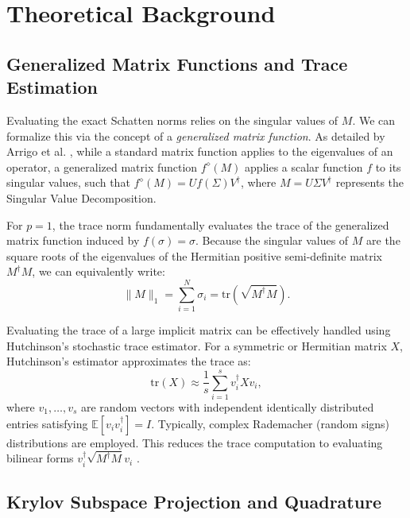 \documentclass[a4paper,11pt]{article}
\begin{document}
\section{Theoretical Background}

\subsection{Generalized Matrix Functions and Trace Estimation}

Evaluating the exact Schatten norms relies on the singular values of $M$. We can formalize this via the concept of a \textit{generalized matrix function}. As detailed by Arrigo et al. \cite{arrigo2016computation}, while a standard matrix function applies to the eigenvalues of an operator, a generalized matrix function $f^\diamond(M)$ applies a scalar function $f$ to its singular values, such that $f^\diamond(M) = U f(\Sigma) V^\dagger$, where $M = U \Sigma V^\dagger$ represents the Singular Value Decomposition.

For $p=1$, the trace norm fundamentally evaluates the trace of the generalized matrix function induced by $f(\sigma) = \sigma$. Because the singular values of $M$ are the square roots of the eigenvalues of the Hermitian positive semi-definite matrix $M^\dagger M$, we can equivalently write:
\begin{equation}
  \|M\|_1 = \sum_{i=1}^N \sigma_i = \mathrm{tr}\left( \sqrt{M^\dagger M} \right).
\end{equation}

Evaluating the trace of a large implicit matrix can be effectively handled using Hutchinson's stochastic trace estimator. For a symmetric or Hermitian matrix $X$, Hutchinson's estimator approximates the trace as:
\begin{equation}
  \mathrm{tr}(X) \approx \frac{1}{s} \sum_{i=1}^s v_i^\dagger X v_i,
\end{equation}
where $v_1, \dots, v_s$ are random vectors with independent identically distributed entries satisfying $\mathbb{E}[v_i v_i^\dagger] = I$. Typically, complex Rademacher (random signs) distributions are employed. This reduces the trace computation to evaluating bilinear forms $v_i^\dagger \sqrt{M^\dagger M} v_i$ \cite{benzi2026estimation}.

\subsection{Krylov Subspace Projection and Quadrature}
\end{document}
